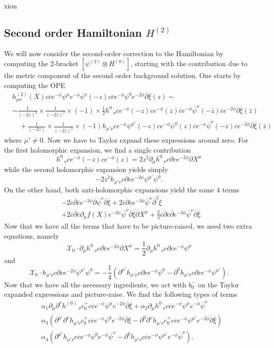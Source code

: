 xion\documentclass[12pt]{article}
\def\be{\begin{equation}}
\def\ee{\end{equation}}
\def\ie{\begin{equation}\begin{aligned}}
\def\fe{\end{aligned}\end{equation}}
\numberwithin{equation}{section}
\newcommand{\B}[1]{\overline{#1}}
\begin{document}
\subsection{Second order Hamiltonian $H^{(2)}$}
We will now consider the second-order correction to the Hamiltonian by computing the 2-bracket $[\psi^{(2)}\otimes H^{(0)}]$, starting with the contribution due to the metric component of the second order background solution. One starts by computing the OPE
\ie
    &h_{\mu\nu}^{(2)}(X)c\B{c}e^{-\phi}\psi^{\mu}e^{-\B{\phi}}\B{\psi^{\nu}}(-z)c\B{c}e^{-\phi}\psi^0e^{-2\B{\phi}}\B{\partial}\B{\xi}(z)\sim\\
    &\sim\frac{1}{(-2z)^2}\times\frac{1}{(-2\B{z})^2}\times(-1)\times\frac{1}{2}h^{0}\,_{\nu}ce^{-\phi}(-z)ce^{-\phi}(z)\B{c}e^{-\B{\phi}}\B{\psi}^{\nu}(-\B{z})\B{c}e^{-2\B{\phi}}\B{\partial}\B{\xi}(\B{z})\\
    &\quad+\frac{1}{(-2z)}\times\frac{1}{(-2\B{z})^2}\times(-1)h_{\mu'\nu}ce^{-\phi}\psi^{\mu'}(-z)ce^{-\phi}\psi^0(z)\B{c}e^{-\B{\phi}}\B{\psi}^{\nu}(-\B{z})\B{c}e^{-2\B{\phi}}\B{\partial}\B{\xi}(\B{z})
\fe
where $\mu'\neq0$. Now we have to Taylor expand these expressions around zero. For the first holomorphic expansion, we find a single contribution
\be
    h^{0}\,_{\nu}ce^{-\phi}(-z)ce^{-\phi}(z)=2z^2\partial_{\mu}h^{0}\,_{\nu}c\partial ce^{-2\phi}\partial X^{\mu}
\ee
while the second holomorphic expansion yields simply
\be
    -2z^2h_{\mu'\nu}c\partial ce^{-2\phi}\psi^{\mu'}\psi^{0}.
\ee
On the other hand, both anti-holomorphic expansions yield the same 4 terms
\ie \label{antiholTaylor}
    &-2\B{c}\B{\partial}\B{c}e^{-3\B{\phi}}\B{\partial}\B{\psi}^{\nu}\B{\partial}\B{\xi}+2\B{c}\B{\partial}\B{c}e^{-3\B{\phi}}\B{\psi}^{\nu}\B{\partial}^2\B{\xi}\\
    &+2\B{c}\B{\partial}\B{c}\partial_{\mu}f(X)e^{-3\B{\psi}}\B{\psi}^{\nu}\B{\partial}\B{\xi}\B{\partial}X^{\mu}+\frac{2}{3}\B{c}\B{\partial}\B{c}\B{\partial}e^{-3\B{\phi}}\B{\psi}^{\nu}\B{\partial}\B{\xi}.
\fe
Now that we have all the terms that have to be picture-raised, we need two extra equations, namely
\be
    \mathcal{X}_0\cdot\partial_{\mu}h^{0}\,_{\nu}c\partial ce^{-2\phi}\partial X^{\mu}=\frac{1}{2}\partial_{\mu}h^0\,_{\nu}c\partial ce^{-\phi}\psi^{\mu}
\ee
and
\be
    \mathcal{X}_0\cdot h_{\mu'\nu}c\partial ce^{-2\phi}\psi^{\mu'}\psi^{0}=-\frac{1}{4}(\partial^{\mu'}h_{\mu'\nu}c\partial ce^{-\phi}\psi^0-\partial^0h_{\mu'\nu}c\partial ce^{-\phi}\psi^{\mu'}).
\ee
Now that we have all the necessary ingredients, we act with $b_0^-$ on the Taylor expanded expressions and picture-raise. We find the following types of terms
\ie
    &\alpha_1\partial_{\mu}\partial^{\nu}h^{(0)}\,_{\nu}c_0^+c\B{c}e^{-\phi}\psi^{\mu}e^{-2\B{\phi}}\B{\partial}\B{\xi}+\alpha_2\partial_{\mu}h^0\,_{\nu}c\B{c}e^{-\phi}\psi^{\mu}e^{-\B{\phi}}\B{\psi}^{\nu}\\
    &\alpha_3(\partial^{\mu'}\partial^{\nu}h_{\mu'\nu}c_0^+c\B{c}e^{-\phi}\psi^0e^{-2\B{\phi}}\B{\partial}\B{\xi}-\partial^0\partial^{\nu}h_{\mu'\nu}c_0^+c\B{c}e^{-\phi}\psi^{\mu'}e^{-2\B{\phi}}\B{\partial}\B{\xi})\\
    &\alpha_4(\partial^{\mu'}h_{\mu'\nu}c\B{c}e^{-\phi}\psi^0e^{-\B{\phi}}\B{\psi}^{\nu}-\partial^0h_{\mu'\nu}c\B{c}e^{-\phi}\psi^{\mu'}e^{-\B{\phi}}\B{\psi}^{\nu}).
\fe
\end{document}
